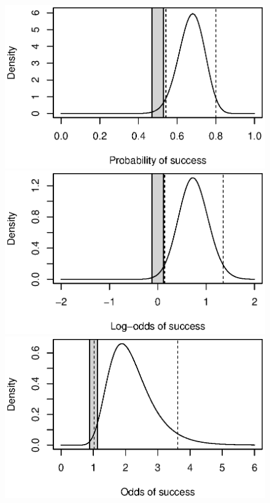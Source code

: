 \documentclass[9pt,twocolumn,twoside]{cidlab-draft}\templatetype{cidlab-invited}
\begin{document}
\begin{figure}[!!ht]
    \centering
    \includegraphics[trim=0 15 30 40,clip,scale=.7]{p/probs.eps}\\
    \includegraphics[trim=0 15 30 40,clip,scale=.7]{p/log_odds.eps}\\
    \includegraphics[trim=0 15 30 40,clip,scale=.7]{p/odds.eps}

\end{figure}
\end{document}
